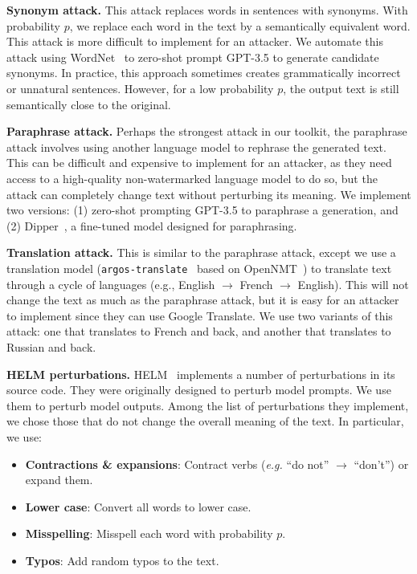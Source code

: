 \smallskip\noindent\textbf{Synonym attack.}
%
This attack replaces words in sentences with synonyms.
%
With probability $p$, we replace each word in the text by a semantically equivalent word.
%
This attack is more difficult to implement for an attacker.
We automate this attack using WordNet~\citep{miller_wordnet_1994} to zero-shot prompt GPT-3.5 to generate candidate synonyms.
%
%
In practice, this approach sometimes creates grammatically incorrect or unnatural sentences.
%
However, for a low probability $p$, the output text is still semantically 
close to the original.

\smallskip\noindent\textbf{Paraphrase attack.}
%
Perhaps the strongest attack in our toolkit, the paraphrase attack involves using another language model to rephrase the generated text.
%
This can be difficult and expensive to implement for an attacker, as they need access to a high-quality non-watermarked language model to do so, but the attack can completely change text without perturbing its meaning.
%
We implement two versions: (1) zero-shot prompting GPT-3.5 to 
paraphrase a generation, and (2) Dipper~\citep{krishna_paraphrasing_2023}, a fine-tuned model designed for paraphrasing.

\smallskip\noindent\textbf{Translation attack.}
%
This is similar to the paraphrase attack, except we use a translation model (\texttt{argos-translate}~\citep{finlay_argos_2021} based on OpenNMT~\citep{klein_opennmt_2017}) to translate text through a cycle of languages (e.g., English $\to$ French $\to$ English).
%
This will not change the text as much as the paraphrase attack, but it is easy for an attacker to implement since they can use Google Translate.
%
We use two variants of this attack: one that translates to French and back, and another that translates to Russian and back.

\smallskip\noindent\textbf{HELM perturbations.}
%
HELM~\citep{liang_holistic_2022} implements a number of perturbations in its source code. 
%
They were originally designed to perturb model prompts. We use them to perturb model outputs. 
%
Among the list of perturbations they implement, we chose those that do not change the overall meaning of the text.
%
In particular, we use:
\begin{itemize}[leftmargin=\itemlm,nosep]
    \item \textbf{Contractions \& expansions}: Contract verbs (\textit{e.g.} ``do not'' $\to$ ``don't'') 
    or expand them.
    \item \textbf{Lower case}: Convert all words to lower case.
    \item \textbf{Misspelling}: Misspell each word with probability $p$.
    \item \textbf{Typos}: Add random typos to the text.
\end{itemize}

